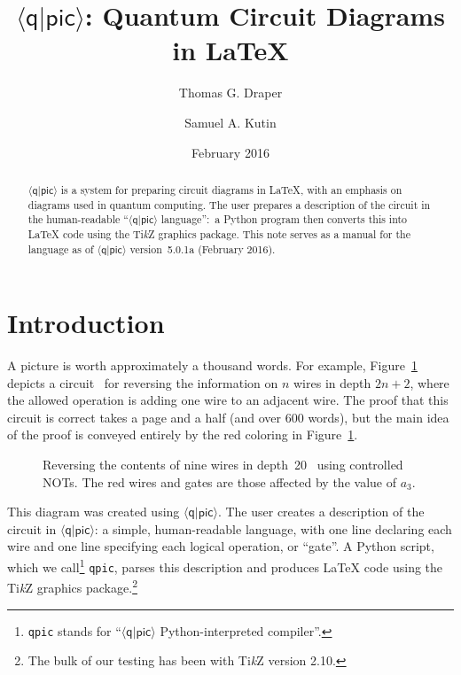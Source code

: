\documentclass[twoside,12pt]{article}
\title{$\langle\mathsf{q}|\mathsf{pic}\rangle$: Quantum Circuit Diagrams in \LaTeX}
\author{Thomas G. Draper \and Samuel A. Kutin}
\date{February 2016}
\newcommand{\qpic}{$\langle\mathsf{q}|\mathsf{pic}\rangle$\xspace}
\newcommand{\qpicpy}{{\tt qpic}\xspace}
\newcommand{\TikZ}{Ti\emph{k}Z\xspace}
\begin{document}
\maketitle
\begin{abstract} 
{$\langle\mathsf{q}|\mathsf{pic}\rangle$\xspace} is a system
for preparing circuit diagrams in \LaTeX, with an emphasis on diagrams
used in quantum computing.  The user prepares a description of the
circuit in the human-readable
``{$\langle\mathsf{q}|\mathsf{pic}\rangle$\xspace} language'':\ a
Python program then converts this into {\LaTeX} code using the
{Ti\emph{k}Z\xspace} graphics package.  This note serves as a manual
for the language as of
{$\langle\mathsf{q}|\mathsf{pic}\rangle$\xspace} version~5.0.1a
(February 2016).
\end{abstract}

\tableofcontents
\newpage

\section{Introduction}

A picture is worth approximately a thousand words.  For example, Figure~\ref{fig-rev} depicts a
circuit~\cite{kutin-moulton-smithline} for reversing the information on $n$ wires in depth $2n+2$,
where the allowed operation is adding one wire to an adjacent wire.  The proof that this circuit
is correct takes a page and a half (and over 600 words), but the main idea of the proof is conveyed
entirely by the red coloring in Figure~\ref{fig-rev}.

\begin{figure}[h!]
\begin{center}

\end{center}
\caption{Reversing the contents of nine wires in depth~20~\cite{kutin-moulton-smithline} using controlled NOTs.  The red wires and gates are those affected by the value of $a_3$.}
\label{fig-rev}
\end{figure}


This diagram was created using \qpic.  The user creates a description of the
circuit in \qpic: a simple, human-readable language, with one line declaring each wire and one line specifying each
logical operation, or ``gate''.  A Python script, which we
call\footnote{\qpicpy stands for ``\qpic Python-interpreted compiler''.}
\qpicpy, parses this description
and produces {\LaTeX} code using the \TikZ graphics package.\footnote{The bulk of our testing has been with \TikZ version 2.10.}
\end{document}
